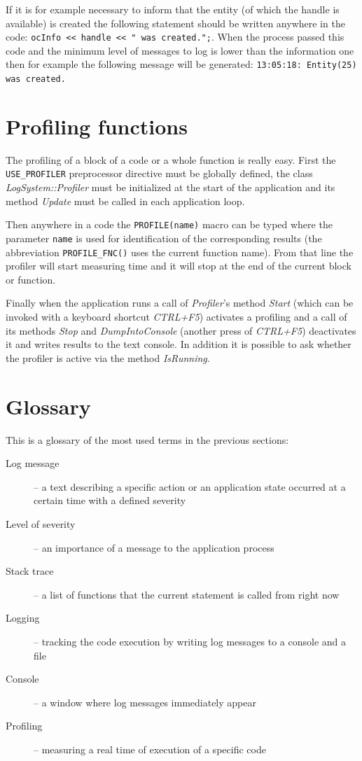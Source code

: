 \documentclass[a4paper, 12pt]{report}
\begin{document}
If it is for example necessary to inform that the entity (of which the handle is available) is created the following statement should be written anywhere in the code: \verb/ocInfo << handle << " was created.";/. When the process passed this code and the minimum level of messages to log is lower than the information one then for example the following message will be generated: \verb/13:05:18: Entity(25) was created./

\section{Profiling functions}
\label{sec:profiling}

The profiling of a block of a code or a whole function is really easy. First the \verb/USE_PROFILER/ preprocessor directive must be globally defined, the class \emph{LogSystem::Profiler} must be initialized at the start of the application and its method \emph{Update} must be called in each application loop.

Then anywhere in a code the \verb/PROFILE(name)/ macro can be typed where the parameter \verb/name/ is used for identification of the corresponding results (the abbreviation \verb/PROFILE_FNC()/ uses the current function name). From that line the profiler will start measuring time and it will stop at the end of the current block or function.

Finally when the application runs a call of \emph{Profiler}'s method \emph{Start} (which can be invoked with a keyboard shortcut \emph{CTRL+F5}) activates a profiling and a call of its methods \emph{Stop} and \emph{DumpIntoConsole} (another press of \emph{CTRL+F5}) deactivates it and writes results to the text console. In addition it is possible to ask whether the profiler is active via the method \emph{IsRunning}.

\section{Glossary}
This is a glossary of the most used terms in the previous sections:

\begin{description}
  \item[Log message] -- a text describing a specific action or an application state occurred at a certain time with a defined severity
  \item[Level of severity] -- an importance of a message to the application process
  \item[Stack trace] -- a list of functions that the current statement is called from right now
  \item[Logging] -- tracking the code execution by writing log messages to a console and a file
  \item[Console] -- a window where log messages immediately appear
  \item[Profiling] -- measuring a real time of execution of a specific code
\end{description}
\end{document}
